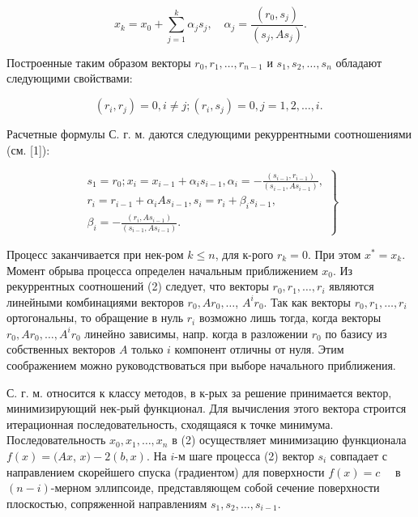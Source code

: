 \documentclass[10pt]{article}
\begin{document}
\[

x_{k}=x_{0}+\sum_{j=1}^{k} \alpha_{j} s_{j}, \quad \alpha_{j}=\frac{\left(r_{0}, s_{j}\right)}{\left(s_{j}, A s_{j}\right)} .

\]



Построенные таким образом векторы $r_{0}, r_{1}, \ldots, r_{n-1}$ и $s_{1}, s_{2}, \ldots, s_{n}$ обладают следующими свойствами:



\[

\left(r_{i}, r_{j}\right)=0, i \neq j ;\left(r_{i}, s_{j}\right)=0, j=1,2, \ldots, i \text {. }

\]



Расчетные формулы С. г. м. даются следующими рекуррентными соотношениями (см. [1]):



\[

\left.\begin{array}{c}

s_{1}=r_{0} ; x_{i}=x_{i-1}+\alpha_{i} s_{i-1}, \alpha_{i}=-\frac{\left(s_{i-1}, r_{i-1}\right)}{\left(s_{i-1}, A s_{i-1}\right)}, \\

r_{i}=r_{i-1}+\alpha_{i} A s_{i-1}, s_{i}=r_{i}+\beta_{i} s_{i-1}, \\

\beta_{i}=-\frac{\left(r_{i}, A s_{i-1}\right)}{\left(s_{i-1}, A s_{i-1}\right)} .

\end{array}\right\}

\]



Процесс заканчивается при нек-ром $k \leqslant n$, для к-рого $r_{k}=0$. При этом $x^{*}=x_{k}$. Момент обрыва процесса определен начальным приближением $x_{0}$. Из рекуррентных соотношений (2) следует, что векторы $r_{0}, r_{1}, \ldots, r_{i}$ являются линейными комбинациями векторов $r_{0}, A r_{0}, \ldots$, $A^{i} r_{0}$. Так как векторы $r_{0}, r_{1}, \ldots, r_{i}$ ортогональны, то обращение в нуль $r_{i}$ возможно лишь тогда, когда векторы $r_{0}, A r_{0}, \ldots, A^{i} r_{0}$ линейно зависимы, напр. когда в разложении $r_{0}$ по базису из собственных векторов $A$ только $i$ компонент отличны от нуля. Этим соображением можно руководствоваться при выборе начального приближения.



С. г. м. относится к классу методов, в к-рых за решение принимается вектор, минимизирующий нек-рый функционал. Для вычисления этого вектора строится итерационная последовательность, сходящаяся к точке минимума. Последовательность $x_{0}, x_{1}, \ldots, x_{n}$ в (2) осуществляет минимизацию функционала $f(x)=(A x$, $x)-2(b, x)$. На $i$-м шаге процесса (2) вектор $s_{i}$ совпадает с направлением скорейшего спуска (градиентом) для поверхности $f(x)=c \quad$ в $(n-i)$-мерном эллипсоиде, представляющем собой сечение поверхности плоскостью, сопряженной направлениям $s_{1}, s_{2}, \ldots, s_{i-1}$.
\end{document}
